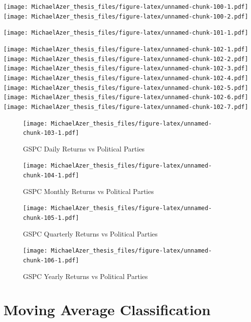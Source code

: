 \documentclass[]{book}
\begin{document}
\texttt{[image: MichaelAzer\_thesis\_files/figure-latex/unnamed-chunk-100-1.pdf]} \texttt{[image: MichaelAzer\_thesis\_files/figure-latex/unnamed-chunk-100-2.pdf]}

\texttt{[image: MichaelAzer\_thesis\_files/figure-latex/unnamed-chunk-101-1.pdf]}

\texttt{[image: MichaelAzer\_thesis\_files/figure-latex/unnamed-chunk-102-1.pdf]} \texttt{[image: MichaelAzer\_thesis\_files/figure-latex/unnamed-chunk-102-2.pdf]} \texttt{[image: MichaelAzer\_thesis\_files/figure-latex/unnamed-chunk-102-3.pdf]} \texttt{[image: MichaelAzer\_thesis\_files/figure-latex/unnamed-chunk-102-4.pdf]} \texttt{[image: MichaelAzer\_thesis\_files/figure-latex/unnamed-chunk-102-5.pdf]} \texttt{[image: MichaelAzer\_thesis\_files/figure-latex/unnamed-chunk-102-6.pdf]} \texttt{[image: MichaelAzer\_thesis\_files/figure-latex/unnamed-chunk-102-7.pdf]}

\begin{figure}
\centering
\texttt{[image: MichaelAzer\_thesis\_files/figure-latex/unnamed-chunk-103-1.pdf]}
\caption{\label{fig:unnamed-chunk-103}\label{fig:figs}GSPC Daily Returns vs Political Parties}
\end{figure}

\begin{figure}
\centering
\texttt{[image: MichaelAzer\_thesis\_files/figure-latex/unnamed-chunk-104-1.pdf]}
\caption{\label{fig:unnamed-chunk-104}\label{fig:figs}GSPC Monthly Returns vs Political Parties}
\end{figure}

\begin{figure}
\centering
\texttt{[image: MichaelAzer\_thesis\_files/figure-latex/unnamed-chunk-105-1.pdf]}
\caption{\label{fig:unnamed-chunk-105}\label{fig:figs}GSPC Quarterly Returns vs Political Parties}
\end{figure}

\begin{figure}
\centering
\texttt{[image: MichaelAzer\_thesis\_files/figure-latex/unnamed-chunk-106-1.pdf]}
\caption{\label{fig:unnamed-chunk-106}\label{fig:figs}GSPC Yearly Returns vs Political Parties}
\end{figure}

\hypertarget{moving-average-classification}{%
\section{Moving Average Classification}\label{moving-average-classification}}
\end{document}

